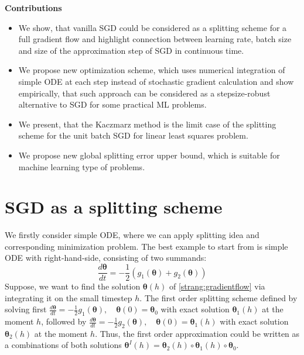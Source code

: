 \documentclass{article}
\newcommand{\vect}[1]{\boldsymbol{\mathbf{#1}}}
\begin{document}
\textbf{Contributions}
\begin{itemize}
    \item We show, that vanilla SGD could be considered as a splitting scheme for a full gradient flow and highlight connection between learning rate, batch size and size of the approximation step of SGD in continuous time.
    \item  We propose new optimization scheme, which uses numerical integration of simple ODE at each step instead of stochastic gradient calculation and show empirically, that such approach can be considered as a stepsize-robust alternative to SGD for some practical ML problems.
    \item We present, that the Kaczmarz method is the limit case of the splitting scheme for the unit batch SGD for linear least squares problem.
    \item We propose new global splitting error upper bound, which is suitable for machine learning type of problems.
\end{itemize}


\section{SGD as a splitting scheme}

We firstly consider simple ODE, where we can apply splitting idea and corresponding minimization problem. The best example to start from is simple ODE with right-hand-side, consisting of two summands:
\begin{equation}
    \frac{d \vect{\theta}}{d t} = - \frac{1}{2} \left( g_1(\vect{\theta}) + g_2(\vect{\theta})\right)
    \label{strang:gradientflow}
\end{equation}
Suppose, we want to find the solution $\vect{\theta}(h)$ of \eqref{strang:gradientflow} via integrating it on the small timestep $h$. The first order splitting scheme defined by solving first $\frac{d \vect{\theta}}{d t} = - \frac{1}{2} g_1(\vect{\theta}), \quad \vect{\theta}(0) = \vect{\theta}_0$ with exact solution $\vect{\theta}_1(h)$ at the moment $h$, followed by $\frac{d \vect{\theta}}{d t} = - \frac{1}{2} g_2(\vect{\theta}), \quad \vect{\theta}(0) = \vect{\theta}_1(h)$ with exact solution $\vect{\theta}_2(h)$ at the moment $h$. Thus, the first order approximation could be written as a combinations of both solutions $\vect{\theta}^I(h) = \vect{\theta}_2(h) \circ \vect{\theta}_1(h) \circ \vect{\theta}_0$.
\end{document}
